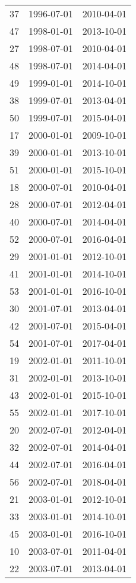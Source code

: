 % 
\begin{tabular}{ccc}
  \hline
  \hline
37 & 1996-07-01 & 2010-04-01 \\ 
  47 & 1998-01-01 & 2013-10-01 \\ 
  27 & 1998-07-01 & 2010-04-01 \\ 
  48 & 1998-07-01 & 2014-04-01 \\ 
  49 & 1999-01-01 & 2014-10-01 \\ 
  38 & 1999-07-01 & 2013-04-01 \\ 
  50 & 1999-07-01 & 2015-04-01 \\ 
  17 & 2000-01-01 & 2009-10-01 \\ 
  39 & 2000-01-01 & 2013-10-01 \\ 
  51 & 2000-01-01 & 2015-10-01 \\ 
  18 & 2000-07-01 & 2010-04-01 \\ 
  28 & 2000-07-01 & 2012-04-01 \\ 
  40 & 2000-07-01 & 2014-04-01 \\ 
  52 & 2000-07-01 & 2016-04-01 \\ 
  29 & 2001-01-01 & 2012-10-01 \\ 
  41 & 2001-01-01 & 2014-10-01 \\ 
  53 & 2001-01-01 & 2016-10-01 \\ 
  30 & 2001-07-01 & 2013-04-01 \\ 
  42 & 2001-07-01 & 2015-04-01 \\ 
  54 & 2001-07-01 & 2017-04-01 \\ 
  19 & 2002-01-01 & 2011-10-01 \\ 
  31 & 2002-01-01 & 2013-10-01 \\ 
  43 & 2002-01-01 & 2015-10-01 \\ 
  55 & 2002-01-01 & 2017-10-01 \\ 
  20 & 2002-07-01 & 2012-04-01 \\ 
  32 & 2002-07-01 & 2014-04-01 \\ 
  44 & 2002-07-01 & 2016-04-01 \\ 
  56 & 2002-07-01 & 2018-04-01 \\ 
  21 & 2003-01-01 & 2012-10-01 \\ 
  33 & 2003-01-01 & 2014-10-01 \\ 
  45 & 2003-01-01 & 2016-10-01 \\ 
  10 & 2003-07-01 & 2011-04-01 \\ 
  22 & 2003-07-01 & 2013-04-01 \\ 

\end{tabular}
